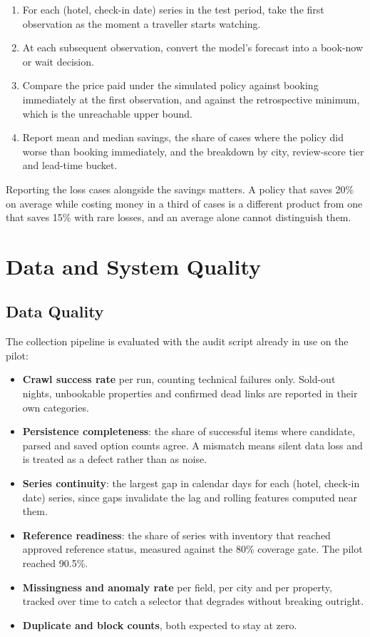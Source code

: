 \begin{enumerate}[leftmargin=*]
    \item For each (hotel, check-in date) series in the test period, take the first observation as the moment a traveller starts watching.
    \item At each subsequent observation, convert the model's forecast into a book-now or wait decision.
    \item Compare the price paid under the simulated policy against booking immediately at the first observation, and against the retrospective minimum, which is the unreachable upper bound.
    \item Report mean and median savings, the share of cases where the policy did worse than booking immediately, and the breakdown by city, review-score tier and lead-time bucket.
\end{enumerate}

Reporting the loss cases alongside the savings matters. A policy that saves 20\% on average while costing money in a third of cases is a different product from one that saves 15\% with rare losses, and an average alone cannot distinguish them.

\section{Data and System Quality}

\subsection{Data Quality}

The collection pipeline is evaluated with the audit script already in use on the pilot:

\begin{itemize}[leftmargin=*]
    \item \textbf{Crawl success rate} per run, counting technical failures only. Sold-out nights, unbookable properties and confirmed dead links are reported in their own categories.
    \item \textbf{Persistence completeness}: the share of successful items where candidate, parsed and saved option counts agree. A mismatch means silent data loss and is treated as a defect rather than as noise.
    \item \textbf{Series continuity}: the largest gap in calendar days for each (hotel, check-in date) series, since gaps invalidate the lag and rolling features computed near them.
    \item \textbf{Reference readiness}: the share of series with inventory that reached approved reference status, measured against the 80\% coverage gate. The pilot reached 90.5\%.
    \item \textbf{Missingness and anomaly rate} per field, per city and per property, tracked over time to catch a selector that degrades without breaking outright.
    \item \textbf{Duplicate and block counts}, both expected to stay at zero.
\end{itemize}

